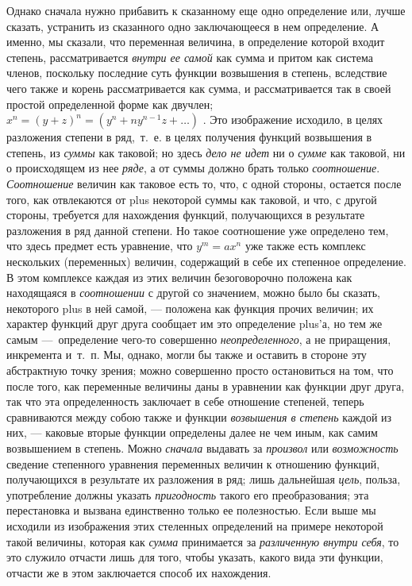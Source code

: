 {Однако сначала нужно прибавить к сказанному еще одно определение или, лучше
сказать, устранить из сказанного одно заключающееся в нем определение. А
именно, мы сказали, что переменная величина, в определение которой входит
степень, рассматривается {\em внутри ее самой} как
сумма и притом как система членов, поскольку последние суть функции
возвышения в степень, вследствие чего также и корень рассматривается как
сумма, и рассматривается так в своей простой определенной форме как
двучлен;  $x^n = (y + z)^n = (y^n + \mathit{ny}^{n-1}z + {\dots})$ . Это изображение
исходило, в целях разложения степени в ряд,~т.~е. в целях получения функций
возвышения в степень, из {\em суммы} как таковой; но
здесь {\em дело не идет} ни о
{\em сумме} как таковой, ни о происходящем из нее
{\em ряде}, а от суммы должно брать только
{\em соотношение}.
{\em Соотношение} величин как таковое есть то, что, с
одной стороны, остается после того, как отвлекаются от plus некоторой суммы
как таковой, и что, с другой стороны, требуется для нахождения функций,
получающихся в результате разложения в ряд данной степени. Но такое
соотношение уже определено тем, что здесь предмет есть уравнение, что 
$y^m = ax^n$  уже также есть комплекс нескольких (переменных) величин,
содержащий в себе их степенное определение. В этом комплексе каждая из этих
величин безоговорочно положена как находящаяся в
{\em соотношении} с другой со значением, можно было бы
сказать, некоторого plus в ней самой, — положена как функция прочих
величин; их характер функций друг друга сообщает им это определение plus'а,
но тем же самым —~определение чего-то совершенно
{\em неопределенного}, а не приращения, инкремента
и~т.~п. Мы, однако, могли бы также и оставить в стороне эту абстрактную
точку зрения; можно совершенно просто остановиться на том, что после того,
как переменные величины даны в уравнении как функции друг друга, так что
эта определенность заключает в себе отношение степеней, теперь сравниваются
между собою также и функции {\em возвышения в степень}
каждой из них, — каковые вторые функции определены далее не чем иным, как
самим возвышением в степень. Можно {\em сначала}
выдавать за {\em произвол} или
{\em возможность} сведение степенного уравнения
переменных величин к отношению функций, получающихся в результате их
разложения в ряд; лишь дальнейшая {\em цель}, польза,
употребление должны указать {\em пригодность} такого
его преобразования; эта перестановка и вызвана единственно только ее
полезностью. Если выше мы исходили из изображения этих стеленных
определений на примере некоторой такой величины, которая как
{\em сумма} принимается за
{\em различенную внутри себя}, то это служило отчасти
лишь для того, чтобы указать, какого вида эти функции, отчасти же в этом
заключается способ их нахождения.

}
